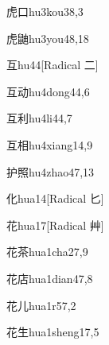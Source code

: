 \begin{entry}{虎口}{hu3kou3}{8,3}
\end{entry}

\begin{entry}{虎鼬}{hu3you4}{8,18}
\end{entry}

\begin{entry}{互}{hu4}{4}[Radical ⼆]
\end{entry}

\begin{entry}{互动}{hu4dong4}{4,6}
\end{entry}

\begin{entry}{互利}{hu4li4}{4,7}
\end{entry}

\begin{entry}{互相}{hu4xiang1}{4,9}
\end{entry}

\begin{entry}{护照}{hu4zhao4}{7,13}
\end{entry}

\begin{entry}{化}{hua1}{4}[Radical 匕]
\end{entry}

\begin{entry}{花}{hua1}{7}[Radical 艸]
\end{entry}

\begin{entry}{花茶}{hua1cha2}{7,9}
\end{entry}

\begin{entry}{花店}{hua1dian4}{7,8}
\end{entry}

\begin{entry}{花儿}{hua1r5}{7,2}
\end{entry}

\begin{entry}{花生}{hua1sheng1}{7,5}
\end{entry}

